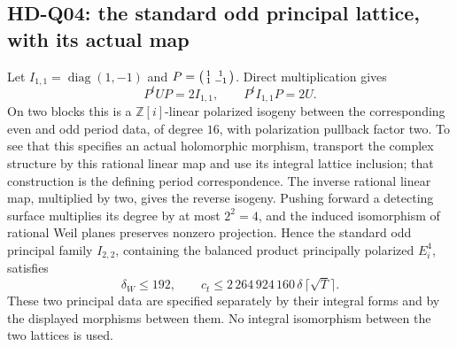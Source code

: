 \subsection{HD-Q04: the standard odd principal lattice, with its actual map}
Let $I_{1,1}=\operatorname{diag}(1,-1)$ and
$P=\begin{psmallmatrix}1&1\\1&-1\end{psmallmatrix}$. Direct multiplication gives
\[
 P^tUP=2I_{1,1},\qquad P^tI_{1,1}P=2U.
\]
On two blocks this is a $\mathbb Z[i]$-linear polarized isogeny between the corresponding even and odd period data, of degree $16$, with polarization pullback factor two. To see that this specifies an actual holomorphic morphism, transport the complex structure by this rational linear map and use its integral lattice inclusion; that construction is the defining period correspondence. The inverse rational linear map, multiplied by two, gives the reverse isogeny. Pushing forward a detecting surface multiplies its degree by at most $2^2=4$, and the induced isomorphism of rational Weil planes preserves nonzero projection. Hence the standard odd principal family $I_{2,2}$, containing the balanced product principally polarized $E_i^4$, satisfies
\[
 \delta_W\le192,\qquad
 c_t\le2\,264\,924\,160\,\delta\,\lceil\sqrt T\rceil.
\]
These two principal data are specified separately by their integral forms and by the displayed morphisms between them. No integral isomorphism between the two lattices is used.
